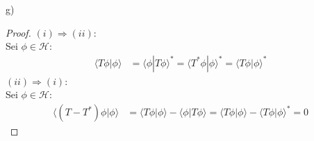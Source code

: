 \documentclass[a4paper,12pt]{article}
\newcommand{\brak}{}
\begin{document}
g)
\begin{proof}
$(i)\Rightarrow(ii)$:\\
Sei $\phi\in\mathcal{H  }$:
\begin{align*}
\brak\langle {T\phi}| {\phi}\rangle&=\brak\langle {\phi}| {T\phi}\rangle^\ast=\brak\langle {T^\ast\phi}| {\phi}\rangle^\ast=\brak\langle {T\phi}| {\phi}\rangle^\ast
\end{align*}
$(ii)\Rightarrow(i)$:\\
Sei $\phi\in\mathcal{H  }$:
\begin{align*}
\brak\langle {(T-T^\ast)\phi}| {\phi}\rangle&=\brak\langle {T\phi}| {\phi}\rangle-\brak\langle {\phi}| {T\phi}\rangle=\brak\langle {T\phi}| {\phi}\rangle-\brak\langle {T\phi}| {\phi}\rangle^\ast=0
\end{align*}
\end{proof}
\end{document}
